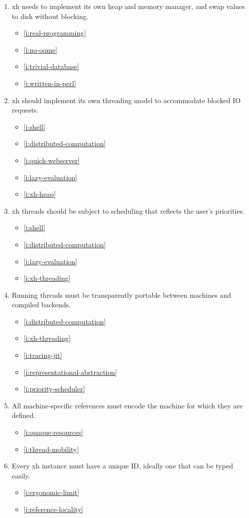 \documentclass{report}
\makeatletter
\newcommand*{\Label}[2]{%
  \@bsphack
  \begingroup
    \label{#1-original}%
    \def\@currentlabel{#2 [\ref{#1-original}]}%
    \label{#1}%
  \endgroup
  \@esphack
}
\makeatother
\begin{document}
\begin{enumerate}
\item{}\Label{i:xh-heap}{heap}
  xh needs to implement its own heap and memory manager, and swap values to
  disk without blocking.
\begin{itemize}
\item \ref{i:real-programming}
\item \ref{i:no-oome}
\item \ref{i:trivial-database}
\item \ref{i:written-in-perl}
\end{itemize}
\item{}\Label{i:xh-threading}{threading}
  xh should implement its own threading model to accommodate blocked IO
  requests.
\begin{itemize}
\item \ref{i:shell}
\item \ref{i:distributed-computation}
\item \ref{i:quick-webserver}
\item \ref{i:lazy-evaluation}
\item \ref{i:xh-heap}
\end{itemize}
\item{}\Label{i:priority-scheduler}{threadscheduler}
  xh threads should be subject to scheduling that reflects the user's
  priorities.
\begin{itemize}
\item \ref{i:shell}
\item \ref{i:distributed-computation}
\item \ref{i:lazy-evaluation}
\item \ref{i:xh-threading}
\end{itemize}
\item{}\Label{i:thread-mobility}{threadmobility}
  Running threads must be transparently portable between machines and
  compiled backends.
\begin{itemize}
\item \ref{i:distributed-computation}
\item \ref{i:xh-threading}
\item \ref{i:tracing-jit}
\item \ref{i:representational-abstraction}
\item \ref{i:priority-scheduler}
\end{itemize}
\item{}\Label{i:reference-locality}{refaffinity}
  All machine-specific references must encode the machine for which they
  are defined.
\begin{itemize}
\item \ref{i:opaque-resources}
\item \ref{i:thread-mobility}
\end{itemize}
\item{}\Label{i:unique-ids}{uniqueid}
  Every xh instance must have a unique ID, ideally one that can be typed
  easily.
\begin{itemize}
\item \ref{i:ergonomic-limit}
\item \ref{i:reference-locality}
\end{itemize}


\end{enumerate}
\end{document}
